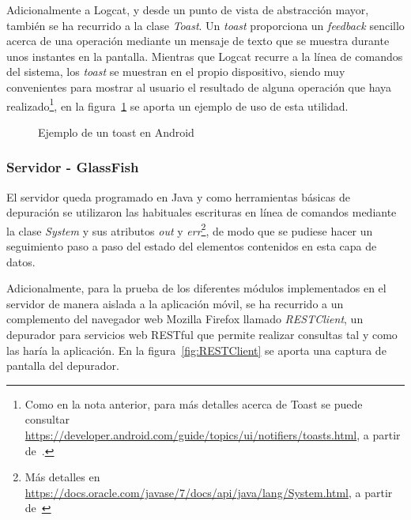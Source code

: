 Adicionalmente a Logcat, y desde un punto de vista de abstracción mayor, también se ha recurrido a la clase \emph{Toast}. Un \emph{toast} proporciona un \textit{feedback} sencillo acerca de una operación mediante un mensaje de texto que se muestra durante unos instantes en la pantalla. Mientras que Logcat recurre a la línea de comandos del sistema, los \emph{toast} se muestran en el propio dispositivo, siendo muy convenientes para mostrar al usuario el resultado de alguna operación que haya realizado\footnote{Como en la nota anterior, para más detalles acerca de Toast se puede consultar \url{https://developer.android.com/guide/topics/ui/notifiers/toasts.html}, a partir de~\cite{AnDev}.}, en la figura~\ref{fig:ejemploToast} se aporta un ejemplo de uso de esta utilidad.

\begin{figure}
	\centering
	\caption{Ejemplo de un toast en Android}
	\label{fig:ejemploToast}
\end{figure}

\subsubsection{Servidor - GlassFish}

El servidor queda programado en Java y como herramientas básicas de depuración se utilizaron las habituales escrituras en línea de comandos mediante la clase \emph{System} y sus atributos \emph{out} y \emph{err}\footnote{Más detalles en \url{https://docs.oracle.com/javase/7/docs/api/java/lang/System.html}, a partir de~\cite{DocOr}}, de modo que se pudiese hacer un seguimiento paso a paso del estado del elementos contenidos en esta capa de datos.

Adicionalmente, para la prueba de los diferentes módulos implementados en el servidor de manera aislada a la aplicación móvil, se ha recurrido a un complemento del navegador web Mozilla Firefox llamado \emph{RESTClient}, un depurador para servicios web RESTful que permite realizar consultas tal y como las haría la aplicación. En la figura~\ref{fig:RESTClient} se aporta una captura de pantalla del depurador.

